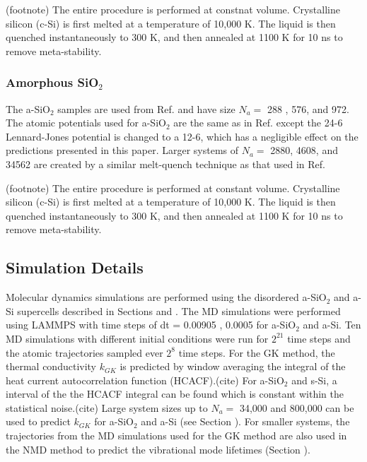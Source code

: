 \documentclass[aps,prb,twocolumn,superscriptaddress,footinbib,amsmath,amssymb,floatfix]{revtex4}
\begin{document}
(footnote)
The entire procedure is performed at constnat volume. Crystalline 
silicon (c-Si) is first 
melted at a temperature of 10,000 K. The liquid is then quenched 
instantaneously to 300 K, and then annealed at 1100 K for 10 ns to remove 
meta-stability. 

\subsubsection{\label{S:Sample:SiO2}Amorphous SiO$_2$}

The a-SiO$_2$ samples are used from Ref.  
and have size $N_a =$ 288 , 576, and 972. The atomic potentials used 
for a-SiO$_2$ are the same as in Ref. 
 except the 24-6 
Lennard-Jones potential is changed to a 12-6, 
which has a negligible effect on the predictions presented in this paper. 
Larger systems of $N_a = $ 2880, 4608, and 34562 are created by a similar 
melt-quench technique as that used in Ref.  

(footnote)
The entire procedure is performed at constant volume. Crystalline 
silicon (c-Si) is first 
melted at a temperature of 10,000 K. The liquid is then quenched 
instantaneously to 300 K, and then annealed at 1100 K for 10 ns to remove 
meta-stability. 

\subsection{\label{S:Simulation}Simulation Details}

Molecular dynamics simulations are performed using the disordered 
a-SiO$_2$ and a-Si supercells described in Sections and . 
The MD simulations were performed using LAMMPS\cite{plimpton_fast_1995}  
with time steps of dt = 0.00905 , 0.0005 for a-SiO$_2$ and a-Si. 
Ten MD simulations with different initial conditions were run 
for $2^21$ time steps and the atomic trajectories sampled 
ever $2^8$ time steps. For the GK method, the thermal conductivity 
$k_{GK}$ is 
predicted by window averaging the integral of the heat current 
autocorrelation function (HCACF).(cite) For a-SiO$_2$ and s-Si, a interval 
of the the HCACF integral can be found which is constant within the 
statistical noise.(cite) Large system sizes up to $N_a = $ 34,000 and 
800,000 can be used to predict $k_{GK}$ for a-SiO$_2$ and a-Si 
(see Section ). For smaller 
systems, the trajectories from the MD simulations used for the GK method 
are also used in the NMD method to predict the vibrational mode 
lifetimes (Section ). 
\end{document}
